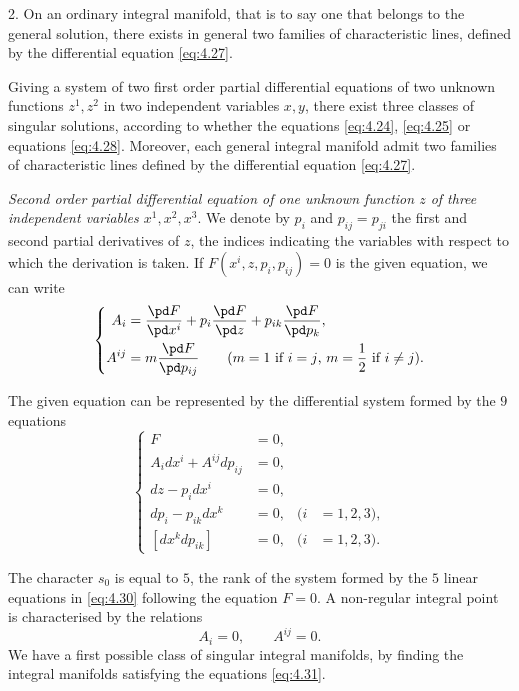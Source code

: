 2. On an ordinary integral manifold, that is to say one that belongs to the general solution, there exists in general two families of characteristic lines, defined by the differential equation \eqref{eq:4.27}.
\begin{thm*}
  Giving a system of two first order partial differential equations of two unknown functions $z^{1},z^{2}$ in two independent variables $x,y$, there exist three classes of singular solutions, according to whether the equations \eqref{eq:4.24}, \eqref{eq:4.25} or equations \eqref{eq:4.28}. Moreover, each general integral manifold admit two families of characteristic lines defined by the differential equation \eqref{eq:4.27}.
\end{thm*}

\vspace{12pt}\fsec \emph{Second order partial differential equation of one unknown function $z$ of three independent variables $x^{1},x^{2},x^{3}$}. We denote by $p_{i}$ and $p_{ij}=p_{ji}$ the first and second partial derivatives of $z$, the indices indicating the variables with respect to which the derivation is taken. If $F(x^{i},z,p_{i},p_{ij})=0$ is the given equation, we can write
\begin{equation}
  \label{eq:4.29}
  \left\{
    \begin{aligned}
      A_{i}&=\frac{\pd F}{\pd x^{i}}+p_{i}\frac{\pd F}{\pd z}+p_{ik}\frac{\pd F}{\pd p_{k}},\\
      A^{ij}&=m\frac{\pd F}{\pd p_{ij}}\qquad \text{($m=1$ if $i=j$, $m=\frac{1}{2}$ if $i\neq j$).}
    \end{aligned}
\right.
\end{equation}

The given equation can be represented by the differential system formed by the $9$ equations
\begin{equation}
  \label{eq:4.30}
  \left\{
    \begin{aligned}
      F&=0,\\
      A_{i}dx^{i}+A^{ij}dp_{ij}&=0,\\
      dz-p_{i}dx^{i}&=0,\\
      dp_{i}-p_{ik}dx^{k}&=0,&(i&=1,2,3),\\
      [dx^{k}dp_{ik}]&=0,&(i&=1,2,3).
    \end{aligned}
\right.
\end{equation}

The character $s_{0}$ is equal to $5$, the rank of the system formed by the $5$ linear equations in \eqref{eq:4.30} following the equation $F=0$. A non-regular integral point is characterised by the relations
\begin{equation}
  \label{eq:4.31}
  A_{i}=0,\qquad A^{ij}=0.
\end{equation}
We have a first possible class of singular integral manifolds, by finding the integral manifolds satisfying the equations \eqref{eq:4.31}.

